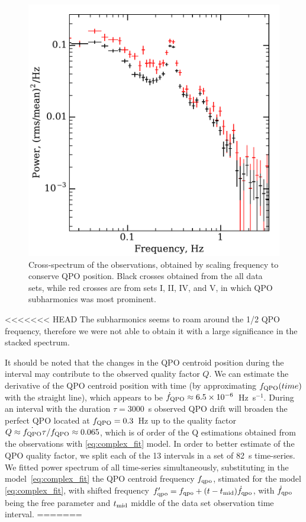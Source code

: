 \documentclass[a4paper,fleqn,usenatbib]{mnras}
\begin{document}
\begin{figure}
        \includegraphics[width=\columnwidth]{folded_cospectr2.pdf}
        \caption{Cross-spectrum of the observations, obtained by scaling frequency to conserve QPO position.
        Black crosses obtained from the all data sets, while red crosses are from sets I, II, IV, and V, in which QPO subharmonics was most prominent.}
        \label{fig:cospec_tracked}
\end{figure}

<<<<<<< HEAD
The subharmonics seems to roam around the 1/2 QPO frequency, therefore we were not able to obtain it with a large significance in the stacked spectrum.

It should be noted that the changes in the QPO centroid position during the interval may contribute to the observed quality factor $Q$.
We can estimate the derivative of the QPO centroid position with time (by approximating $f_{\rm QPO}(time)$ with the straight line), which appears to be $\dot{f}_{\rm QPO} \approx 6.5\times10^{-6}$~Hz~s$^{-1}$. 
During an interval with the duration $\tau = 3000$~s observed QPO drift will broaden the perfect QPO located at $f_{\rm QPO}=0.3$~Hz up to the quality factor $Q \approx \dot{f_{\rm QPO}}\tau/f_{\rm QPO} \approx 0.065$, which is of order of the Q estimations obtained from the observations with \ref{eq:complex_fit} model.
In order to better estimate of the QPO quality factor, we split each of the 13 intervals in a set of 82~s time-series. We fitted power spectrum of all time-series simultaneously,  substituting in the model~\ref{eq:complex_fit} the QPO centroid frequency $f_{\rm qpo}$, stimated for the model \ref{eq:complex_fit}, with shifted frequency $f_{\rm qpo}' = f_{\rm qpo} + (t - t_{\rm mid})\dot{f}_{\rm qpo}$, with $\dot{f}_{\rm qpo}$ being the free parameter and $t_{\rm mid}$ middle of the data set observation time interval. 
=======
\end{document}
